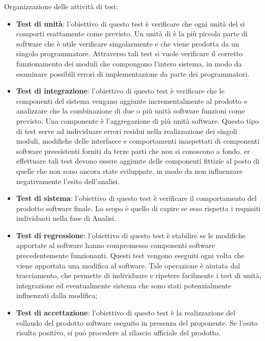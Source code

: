     Organizzazione delle attività di test:
    \begin{itemize}
      \item \textbf{Test di unità}: l'obiettivo di questo test è verificare che ogni unità del  si comporti esattamente come previsto. Un unità di  è la più piccola parte di software che è utile verificare singolarmente e che viene prodotta da un singolo programmatore. Attraverso tali test si vuole verificare il corretto funzionamento dei moduli che compongono l'intero sistema, in modo da esaminare possibili errori di implementazione da parte dei programmatori.

      \item \textbf{Test di integrazione}: l'obiettivo di questo test è verificare che le componenti del sistema vengano aggiunte incrementalmente al prodotto e analizzare che la combinazione di due o più unità software funzioni come previsto. Una componente è l'aggregazione di più unità software.
Questo tipo di test serve ad individuare errori residui nella realizzazione dei singoli moduli, modifiche delle interfacce e comportamenti inaspettati di componenti software preesistenti forniti da terze parti che non si conoscono a fondo.
er effettuare tali test devono essere aggiunte delle componenti fittizie al posto di quelle che non sono ancora state sviluppate, in modo da non influenzare negativamente l'esito dell'analisi.

      \item \textbf{Test di sistema}: l'obiettivo di questo test è verificare il comportamento del prodotto software finale. Lo scopo è quello di capire se esso rispetta i requisiti individuati nella fase di Analisi.

      \item \textbf{Test di regressione}: l'obiettivo di questo test è stabilire se le modifiche apportate al software hanno compromesso componenti software precedentemente funzionanti.
      Questi test vengono eseguiti ogni volta che viene apportata una modifica al software.
      Tale operazione è aiutata dal tracciamento, che permette di individuare e ripetere facilmente i test di unità, integrazione ed eventualmente sistema che sono stati potenzialmente influenzati dalla modifica;
      \item \textbf{Test di accettazione}: l'obiettivo di questo test è la realizzazione del collaudo del prodotto software eseguito in presenza del proponente. Se l'esito risulta positivo, si può procedere al rilascio ufficiale del prodotto.
    \end{itemize}

